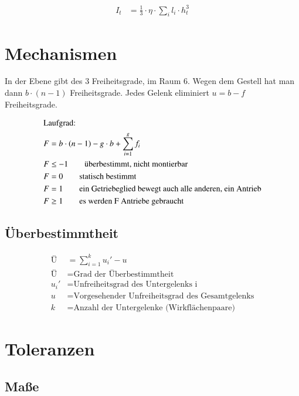 \begin{align*}
I_t &= \frac{1}{3} \cdot \eta \cdot \sum_{i}^{} l_i \cdot h_t^3
\end{align*}

\newpage


\section{Mechanismen}

In der Ebene gibt des 3 Freiheitsgrade, im Raum 6. Wegen dem Gestell hat man dann $b \cdot (n-1)$ Freiheitsgrade. Jedes Gelenk eliminiert $u = b - f$ Freiheitsgrade.

\begin{align*}
\intertext{Laufgrad:}
F &= b \cdot \left( n - 1 \right) - g \cdot b + \sum_{i=1}^{g} f_i \\
F &\leq -1 \qquad \text{überbestimmt, nicht montierbar} \\
F &= 0 \qquad \text{statisch bestimmt} \\
F &= 1 \qquad \text{ein Getriebeglied bewegt auch alle anderen, ein Antrieb} \\
F &\geq 1 \qquad \text{es werden F Antriebe gebraucht}
\end{align*}


\subsection*{Überbestimmtheit}

\begin{align*}
\text{Ü} &= \sum_{i=1}^{k} u_i' - u \\
\text{Ü} &= \text{Grad der Überbestimmtheit} \\
u_i' &= \text{Unfreiheitsgrad des Untergelenks i} \\
u &= \text{Vorgesehender Unfreiheitsgrad des Gesamtgelenks} \\
k &= \text{Anzahl der Untergelenke (Wirkflächenpaare)}
\end{align*}


\newpage

\section{Toleranzen}

\subsection*{Maße}

